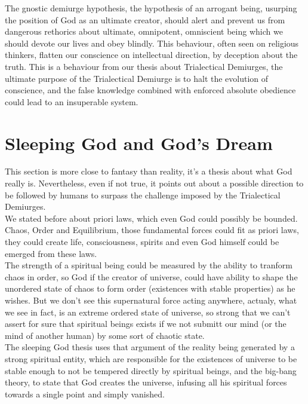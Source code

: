 \documentclass[12pt,a4paper]{article}
\begin{document}
The gnostic demiurge hypothesis, the hypothesis of an arrogant being, usurping the position of God as an ultimate creator, should alert and prevent us from dangerous rethorics about ultimate, omnipotent, omniscient being which we should devote our lives and obey blindly. This behaviour, often seen on religious thinkers, flatten our conscience on intellectual direction, by deception about the truth. This is a behaviour from our thesis about Trialectical Demiurges, the ultimate purpose of the Trialectical Demiurge is to halt the evolution of conscience, and the false knowledge combined with enforced absolute obedience could lead to an insuperable system.\\

\section{Sleeping God and God's Dream}

\hspace{\baselineskip}

This section is more close to fantasy than reality, it's a thesis about what God really is. Nevertheless, even if not true, it points out about a possible direction to be followed by humans to surpass the challenge imposed by the Trialectical Demiurges.\\

We stated before about priori laws, which even God could possibly be bounded. Chaos, Order and Equilibrium, those fundamental forces could fit as priori laws, they could create life, consciousness, spirits and even God himself could be emerged from these laws.\\

The strength of a spiritual being could be measured by the ability to tranform chaos in order, so God if the creator of universe, could have ability to shape the unordered state of chaos to form order (existences with stable properties) as he wishes. But we don't see this supernatural force acting anywhere, actualy, what we see in fact, is an extreme ordered state of universe, so strong that we can't assert for sure that spiritual beings exists if we not submitt our mind (or the mind of another human) by some sort of chaotic state.\\

The sleeping God thesis uses that argument of the reality being generated by a strong spiritual entity, which are responsible for the existences of universe to be stable enough to not be tempered directly by spiritual beings, and the big-bang theory, to state that God creates the universe, infusing all his spiritual forces towards a single point and simply vanished. \\
\end{document}
